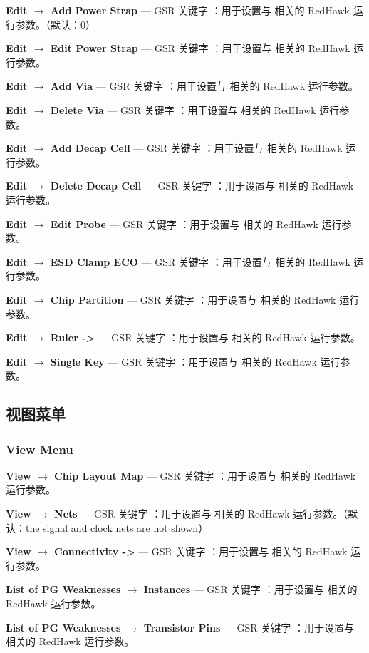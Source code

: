 \textbf{Edit $\rightarrow$ Add Power Strap} — GSR 关键字 ：用于设置与  相关的 RedHawk 运行参数。（默认：0）

\textbf{Edit $\rightarrow$ Edit Power Strap} — GSR 关键字 ：用于设置与  相关的 RedHawk 运行参数。

\textbf{Edit $\rightarrow$ Add Via} — GSR 关键字 ：用于设置与  相关的 RedHawk 运行参数。

\textbf{Edit $\rightarrow$ Delete Via} — GSR 关键字 ：用于设置与  相关的 RedHawk 运行参数。

\textbf{Edit $\rightarrow$ Add Decap Cell} — GSR 关键字 ：用于设置与  相关的 RedHawk 运行参数。

\textbf{Edit $\rightarrow$ Delete Decap Cell} — GSR 关键字 ：用于设置与  相关的 RedHawk 运行参数。

\textbf{Edit $\rightarrow$ Edit Probe} — GSR 关键字 ：用于设置与  相关的 RedHawk 运行参数。

\textbf{Edit $\rightarrow$ ESD Clamp ECO} — GSR 关键字 ：用于设置与  相关的 RedHawk 运行参数。

\textbf{Edit $\rightarrow$ Chip Partition} — GSR 关键字 ：用于设置与  相关的 RedHawk 运行参数。

\textbf{Edit $\rightarrow$ Ruler ->} — GSR 关键字 ：用于设置与  相关的 RedHawk 运行参数。

\textbf{Edit $\rightarrow$ Single Key} — GSR 关键字 ：用于设置与  相关的 RedHawk 运行参数。

\subsection{视图菜单}
\subsubsection*{View Menu}

\textbf{View $\rightarrow$ Chip Layout Map} — GSR 关键字 ：用于设置与  相关的 RedHawk 运行参数。

\textbf{View $\rightarrow$ Nets} — GSR 关键字 ：用于设置与  相关的 RedHawk 运行参数。（默认：the signal and clock nets are not shown）

\textbf{View $\rightarrow$ Connectivity ->} — GSR 关键字 ：用于设置与  相关的 RedHawk 运行参数。

\textbf{List of PG Weaknesses $\rightarrow$ Instances} — GSR 关键字 ：用于设置与  相关的 RedHawk 运行参数。

\textbf{List of PG Weaknesses $\rightarrow$ Transistor Pins} — GSR 关键字 ：用于设置与  相关的 RedHawk 运行参数。

